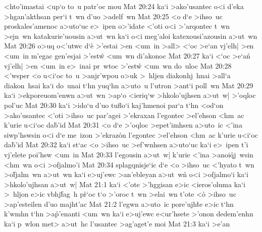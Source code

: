 <hto'imastai
<up`o
to~u
patr'oc
mou\bibvsend
\vs Mat 20:24
ka`i
>ako'usantec
o<i
d'eka
>hgan'akthsan
per`i
t~wn
d'uo
>adelf~wn\bibvsend
\vs Mat 20:25
<o
d`e
>ihso~uc
proskales'amenoc
a>uto`uc
e>~ipen
o>'idate
<'oti
o<i
>'arqontec
t~wn
>ejn~wn
katakurie'uousin
a>ut~wn
ka`i
o<i
meg'aloi
katexousi'azousin
a>ut~wn\bibvsend
\vs Mat 20:26
o>uq
o<'utwc
d`e\r{}
>'estai
>en
<um~in
>all>
<`oc
>e`an
vj'elh|
>en
<um~in
m'egac
gen'esjai
>'est\r{w}
<um~wn
di'akonoc\bibvsend
\vs Mat 20:27
ka`i
<`oc
>e`a\r{n}
vj'elh|
>en
<um~in
e>~inai
pr~wtoc
>'est\r{w}
<um~wn
do~uloc\bibvsend
\vs Mat 20:28
<'wsper
<o
u<i`oc
to~u
>anjr'wpou
o>uk
>~hljen
diakonhj~hnai
>all`a
diakon~hsai
ka`i
do~unai
t`hn
yuq`hn
a>uto~u
l'utron
>ant`i
poll~wn\bibvsend
\vs Mat 20:29
ka`i
>ekporeuom'enwn
a>ut~wn
>ap`o
<ieriq`w
>hkolo'ujhsen
a>ut~w|
>'oqloc
pol'uc\bibvsend
\vs Mat 20:30
ka`i
>ido`u
d'uo
tuflo`i
kaj'hmenoi
par`a
t`hn
<od`on
>ako'usantec
<'oti
>ihso~uc
par'agei
>'ekraxan
l'egontec
>el'ehson
<hm~ac
k'urie
u<i`oc
da\r{b}'id\bibvsend
{}
\vs Mat 20:31
<o
d`e
>'oqloc
>epet'imhsen
a>uto~ic
<'ina
siwp'hswsin
o<i
d`e
me~izon
>'ekraz\r{o}n
l'egontec
>el'ehson
<hm~ac
k'urie
u<i`oc
da\r{b}'id\bibvsend
{}
\vs Mat 20:32
ka`i
st`ac
<o
>ihso~uc
>ef'wnhsen
a>uto`uc
ka`i
e>~ipen
t'i
vj'elete
poi'hsw
<um~in\bibvsend
\vs Mat 20:33
l'egousin
a>ut~w|
k'urie
<'ina
>anoi\r{q}j~wsin
<hm~wn
o<i
>ofjalmo'i\bibvsend
\vs Mat 20:34
splagqnisje`ic
d`e
<o
>ihso~uc
<'hyato
t~wn
>o\r{f}jalm~wn
a>ut~wn
ka`i
e>uj'ewc
>an'ebleyan
a>ut~wn\r{}
o<i
>ofjalmo`i
ka`i
>hkolo'ujhsan
a>ut~w|\bibvsend
\vs Mat 21:1
ka`i
<'ote
>'hggisan
e>ic
<ieros'oluma
ka`i
>~hljon
e>ic
vbhj\r{f}ag~h
p\r{r}`oc
t`o
>'oroc
t~wn
>elai~wn
t'ote
<o\r{}
>ihso~uc
>ap'esteilen
d'uo
majht'ac\bibvsend
\vs Mat 21:2
l'egwn
a>uto~ic
pore'ujh\r{t}e
e>ic
t`hn
k'wmhn
t`hn
>a\r{p}'e\-nan\-ti
<um~wn
ka`i
e>uj'ewc
e<ur'hsete
>'onon
dedem'enhn
ka`i
p~wlon
met>
a>ut~hc
l'usantec
>ag'aget'e
moi\bibvsend
\vs Mat 21:3
ka`i
>e'an
